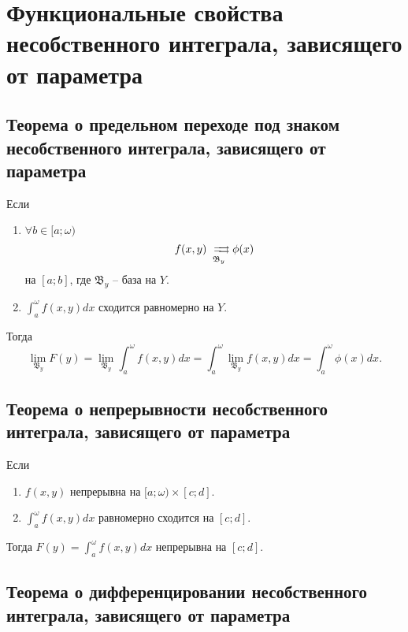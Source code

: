 \section{Функциональные свойства несобственного интеграла, зависящего от параметра}

\setcounter{subsection}{77}

\subsection{Теорема о предельном переходе под знаком несобственного интеграла, зависящего от параметра}

\begin{theorem}\label{theorem:7.3.1}
    Если
    \begin{enumerate}
        \item $\forall b \in [a;\omega)$
              \[
                  f(x,y) \xrightrightarrows[\mathfrak{B}_y]{}\phi(x)
              \]
              на $[a;b]$, где $\mathfrak{B}_y$ -- база на $Y$.
        \item $\int_{a}^{\omega}f(x,y)dx$ сходится равномерно на $Y$.
    \end{enumerate}
    Тогда \[
        \underset{\mathfrak{B}_y}{\lim} F(y) = \underset{\mathfrak{B}_y}{\lim} \int_{a}^{\omega}f(x,y)dx = \int_{a}^{\omega}\underset{\mathfrak{B}_y}{\lim} f(x,y)dx = \int_{a}^{\omega}\phi(x)dx.
    \]
\end{theorem}

\newpage

\subsection{Теорема о непрерывности несобственного интеграла, зависящего от параметра}

\begin{corollary}
    Если \begin{enumerate}
        \item $f(x,y)$ непрерывна на $[a;\omega)\times[c;d]$.
        \item $\int_{a}^{\omega}f(x,y)dx$ равномерно сходится на $[c;d]$.
    \end{enumerate}

    Тогда $F(y) = \int_{a}^{\omega}f(x,y)dx$ непрерывна на $[c;d]$.
\end{corollary}

\subsection{Теорема о дифференцировании несобственного интеграла, зависящего от параметра}

